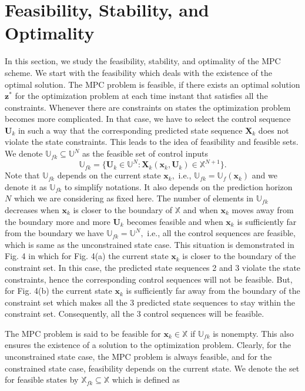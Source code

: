 \documentclass{article}
\begin{document}
\section{Feasibility,  Stability, and Optimality}
In this section, we study the feasibility, stability, and optimality of the MPC scheme. We start with the feasibility which deals with the existence of the optimal solution. The MPC problem is feasible, if there exists an optimal solution $\textbf{z}^{*}$ for the optimization problem at each time instant that satisfies all the constraints.
Whenever there are constraints on states the optimization problem becomes more complicated. In that case, we have to select the control sequence $\textbf{U}_{k}$ in such a way that the corresponding predicted state sequence $\textbf{X}_{k}$ does not violate the state constraints. This leads to the idea of feasibility and feasible sets. We denote $\mathbb{U}_{fk} \subseteq \mathbb{U}^{N}$ as the feasible set of control inputs
\begin{equation}
 \mathbb{U}_{fk}=\{   \textbf{U}_{k}\in \mathbb{U}^{N}: \textbf{X}_{k}(\textbf{x}_{k},\textbf{U}_{k}) \in \mathbb{X}^{{N}+1} \}.
\end{equation}  
Note that $\mathbb{U}_{fk}$ depends on the current state $\textbf{x}_{k},$ i.e., $\mathbb{U}_{fk}=\mathbb{U}_{f}(\textbf{x}_{k})$ and we denote it as $\mathbb{U}_{fk}$ to simplify notations. It also depends on the prediction horizon $N$ which we are considering as fixed here.
The number of elements in $\mathbb{U}_{fk}$ decreases when $\textbf{x}_{k}$ is closer to the boundary of $\mathbb{X}$ and when $\textbf{x}_{k}$
moves away from the boundary more and more $\textbf{U}_{k}$ becomes feasible and when $\textbf{x}_{k}$ is sufficiently far from the boundary we have $\mathbb{U}_{fk}=\mathbb{U}^{N},$ i.e., all the control sequences are feasible,  which is same as the unconstrained state case. This situation is demonstrated in Fig. 4 in which for Fig. 4(a) the current state $\textbf{x}_{k}$ is closer to the boundary of the constraint set. In this case, the predicted state sequences 2 and 3 violate the state constraints, hence the corresponding control sequences will not be feasible. But, for Fig. 4(b) the current state $\textbf{x}_{k}$ is sufficiently far away from the boundary of the constraint set which makes all the 3 predicted state sequences to stay within the constraint set. Consequently, all the 3 control sequences will be feasible. \par The MPC problem is said to be feasible for $\textbf{x}_{k}\in \mathbb{X}$ if $\mathbb{U}_{fk}$ is nonempty. This also ensures the existence of a solution to the optimization problem. Clearly, for the unconstrained state case, the MPC problem is always feasible, and for the constrained state case, feasibility depends on the current state. We denote the set for feasible states by $\mathbb{X}_{fk} \subseteq \mathbb{X}$ which is defined as
\end{document}
